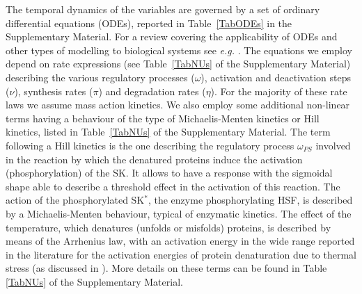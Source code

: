 \documentclass[oneside, 10pt, a4paper, twocolumn]{article}
\begin{document}
The temporal dynamics of the variables are governed by a set of ordinary differential equations (ODEs),
reported in Table~\ref{TabODEs} in the Supplementary Material. 
For a review covering the applicability of ODEs and other types of modelling to biological systems see {\it e.g.} \cite{Pfau2011}. 
The equations we employ depend on rate expressions (see Table~\ref{TabNUs} of the Supplementary Material) describing the various regulatory processes ($\omega$), activation and deactivation steps ($\nu$), synthesis rates ($\pi$) and
degradation rates ($\eta$). 
For the majority of these rate laws we assume mass action kinetics. We also employ some additional non-linear terms having a behaviour of the type of Michaelis-Menten kinetics or Hill kinetics, listed in Table~\ref{TabNUs} of the Supplementary Material. The term following a Hill kinetics is the one describing the regulatory process $\omega_{PS}$ involved in the reaction by which the denatured proteins induce the activation (phosphorylation) of the SK. It allows to have a response with the sigmoidal shape able to describe a threshold effect in the activation of this reaction. 
The action of the phosphorylated SK$^*$, the enzyme phosphorylating HSF, is described by a Michaelis-Menten behaviour, typical of enzymatic kinetics. 
The effect of the temperature, which denatures (unfolds or misfolds) proteins, is described by means of the Arrhenius law, with an activation energy 
in the wide range reported in the literature for the activation energies of protein denaturation due to thermal stress (as discussed in \cite{Bischof2006,He2003}). More details on these terms can be found in Table \ref{TabNUs} of the Supplementary Material.
\end{document}

